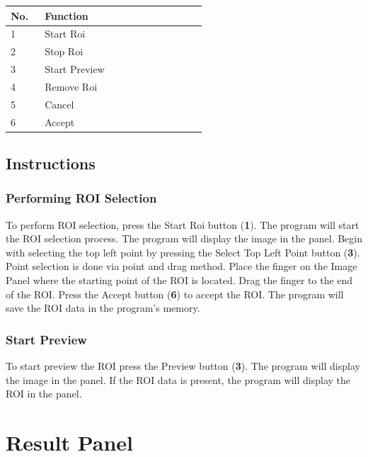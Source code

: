\begin{table}[!ht]
    \centering
    \begin{tabular}{p{0.05\linewidth} | p{0.5\linewidth}}
        \hline
        \textbf{No.} & \textbf{Function} \\ \hline
        1            & Start Roi         \\ \hline
        2            & Stop Roi          \\ \hline
        3            & Start Preview     \\ \hline
        4            & Remove Roi        \\ \hline
        5            & Cancel            \\ \hline
        6            & Accept            \\ \hline
    \end{tabular}
\end{table}

\subsection{Instructions}

\subsubsection{Performing ROI Selection}

To perform ROI selection, press the Start Roi button (\textbf{1}). The program will start the ROI selection process. The program will display the image in the panel. Begin with selecting the top left point by pressing the Select Top Left Point button (\textbf{3}). Point selection is done via point and drag method. Place the finger on the Image Panel where the starting point of the ROI is located. Drag the finger to the end of the ROI. Press the Accept button (\textbf{6}) to accept the ROI. The program will save the ROI data in the program's memory.

\subsubsection{Start Preview}

To start preview the ROI press the Preview button (\textbf{3}). The program will display the image in the panel. If the ROI data is present, the program will display the ROI in the panel.

\pagebreak
\section{Result Panel}
\label{sec:result-panel}


